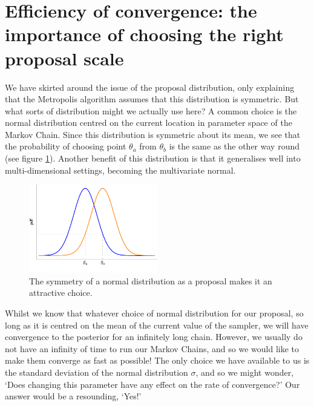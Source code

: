 \documentclass[11pt,fullpage]{book}
\begin{document}
\section{Efficiency of convergence: the importance of choosing the right proposal scale}
We have skirted around the issue of the proposal distribution, only explaining that the Metropolis algorithm assumes that this distribution is symmetric. But what sorts of distribution might we actually use here? A common choice is the normal distribution centred on the current location in parameter space of the Markov Chain. Since this distribution is symmetric about its mean, we see that the probability of choosing point $\theta_a$ from $\theta_b$ is the same as the other way round (see figure \ref{fig:metropolisHastings_normalProposal}). Another benefit of this distribution is that it generalises well into multi-dimensional settings, becoming the multivariate normal.

\begin{figure}
\centerline{\includegraphics[width=0.5\textwidth]{metropolisHastings_normalProposal.pdf}}
\caption{The symmetry of a normal distribution as a proposal makes it an attractive choice.}\label{fig:metropolisHastings_normalProposal}
\end{figure}

Whilst we know that whatever choice of normal distribution for our proposal, so long as it is centred on the mean of the current value of the sampler, we will have convergence to the posterior for an infinitely long chain. However, we usually do not have an infinity of time to run our Markov Chains, and so we would like to make them converge as fast as possible! The only choice we have available to us is the standard deviation of the normal distribution $\sigma$, and so we might wonder, `Does changing this parameter have any effect on the rate of convergence?' Our answer would be a resounding, `Yes!'
\end{document}
